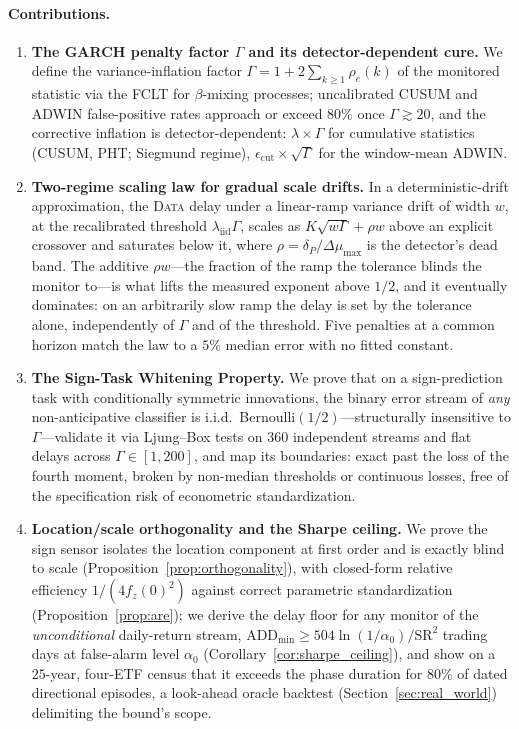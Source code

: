 \documentclass[sigconf,anonymous,review]{acmart}
\theoremstyle{acmdefinition}
\begin{document}
\paragraph{Contributions.}
\begin{enumerate}[nosep, label=\textbf{(C\arabic*)}]
    \item \textbf{The GARCH penalty factor $\Gamma$ and its detector-dependent cure.} We define the variance-inflation factor $\Gamma = 1 + 2\sum_{k\geq 1}\rho_e(k)$ of the monitored statistic via the FCLT for $\beta$-mixing processes; uncalibrated CUSUM and ADWIN false-positive rates approach or exceed $80\%$ once $\Gamma \gtrsim 20$, and the corrective inflation is detector-dependent: $\lambda \times \Gamma$ for cumulative statistics (CUSUM, PHT; Siegmund regime), $\epsilon_{\mathrm{cut}} \times \sqrt{\Gamma}$ for the window-mean ADWIN.
    \item \textbf{Two-regime scaling law for gradual scale drifts.} In a deterministic-drift approximation, the \textsc{Data} delay under a linear-ramp variance drift of width $w$, at the recalibrated threshold $\lambda_{\mathrm{iid}}\Gamma$, scales as $K\sqrt{w\Gamma} + \rho w$ above an explicit crossover and saturates below it, where $\rho = \delta_P/\Delta\mu_{\max}$ is the detector's dead band. The additive $\rho w$---the fraction of the ramp the tolerance blinds the monitor to---is what lifts the measured exponent above $1/2$, and it eventually dominates: on an arbitrarily slow ramp the delay is set by the tolerance alone, independently of $\Gamma$ and of the threshold. Five penalties at a common horizon match the law to a $5\%$ median error with no fitted constant.
    \item \textbf{The Sign-Task Whitening Property.} We prove that on a sign-prediction task with conditionally symmetric innovations, the binary error stream of \emph{any} non-anticipative classifier is i.i.d.\ Bernoulli$(1/2)$---structurally insensitive to $\Gamma$---validate it via Ljung--Box tests on $360$ independent streams and flat delays across $\Gamma \in [1, 200]$, and map its boundaries: exact past the loss of the fourth moment, broken by non-median thresholds or continuous losses, free of the specification risk of econometric standardization.
    \item \textbf{Location/scale orthogonality and the Sharpe ceiling.} We prove the sign sensor isolates the location component at first order and is exactly blind to scale (Proposition~\ref{prop:orthogonality}), with closed-form relative efficiency $1/(4f_z(0)^2)$ against correct parametric standardization (Proposition~\ref{prop:are}); we derive the delay floor for any monitor of the \emph{unconditional} daily-return stream, $\mathrm{ADD}_{\min} \ge 504\ln(1/\alpha_0)/\mathrm{SR}^2$ trading days at false-alarm level $\alpha_0$ (Corollary~\ref{cor:sharpe_ceiling}), and show on a $25$-year, four-ETF census that it exceeds the phase duration for $80\%$ of dated directional episodes, a look-ahead oracle backtest (Section~\ref{sec:real_world}) delimiting the bound's scope.
\end{enumerate}
\end{document}
